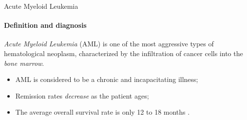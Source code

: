 
\begin{frame}[fragile]{Acute Myeloid Leukemia}
\framesubtitle{Definition and diagnosis}

\emph{Acute Myeloid Leukemia} (AML) is one of the most aggressive types of hematological neoplasm, characterized by the infiltration of cancer cells into the \emph{bone marrow}.

\vspace{0.5cm}

\begin{itemize}
\item AML is considered to be a chronic and incapacitating illness;
\item Remission rates \emph{decrease} as the patient ages;
\item The average overall survival rate is only 12 to 18 months \cite{Pelcovits-2020}.
\end{itemize}
\end{frame}










